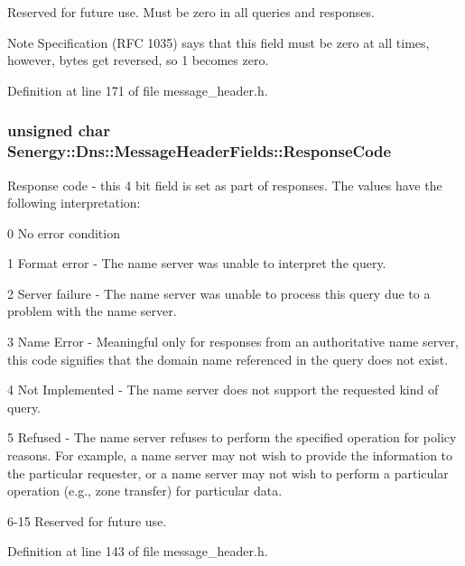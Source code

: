 Reserved for future use. Must be zero in all queries and responses. 

\begin{DoxyNote}{Note}
Specification (R\-F\-C 1035) says that this field must be zero at all times, however, bytes get reversed, so 1 becomes zero. 
\end{DoxyNote}


Definition at line 171 of file message\-\_\-header.\-h.

\hypertarget{struct_senergy_1_1_dns_1_1_message_header_fields_a2f42c94d4e50dd7a63b11c8b374597c4}{
\subsubsection[{Response\-Code}]{\setlength{\rightskip}{0pt plus 5cm}unsigned char Senergy\-::\-Dns\-::\-Message\-Header\-Fields\-::\-Response\-Code}}\label{struct_senergy_1_1_dns_1_1_message_header_fields_a2f42c94d4e50dd7a63b11c8b374597c4}


Response code -\/ this 4 bit field is set as part of responses. The values have the following interpretation\-: 

0 No error condition

1 Format error -\/ The name server was unable to interpret the query.

2 Server failure -\/ The name server was unable to process this query due to a problem with the name server.

3 Name Error -\/ Meaningful only for responses from an authoritative name server, this code signifies that the domain name referenced in the query does not exist.

4 Not Implemented -\/ The name server does not support the requested kind of query.

5 Refused -\/ The name server refuses to perform the specified operation for policy reasons. For example, a name server may not wish to provide the information to the particular requester, or a name server may not wish to perform a particular operation (e.\-g., zone transfer) for particular data.

6-\/15 Reserved for future use. 

Definition at line 143 of file message\-\_\-header.\-h.

